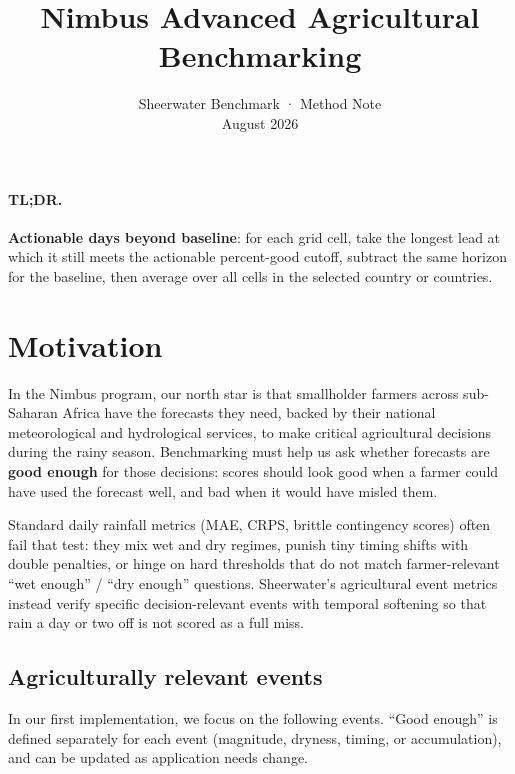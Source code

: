 \documentclass[11pt]{article}
\title{Nimbus Advanced Agricultural Benchmarking}
\author{Sheerwater Benchmark · Method Note\\August 2026}
\date{}
\begin{document}
\maketitle
\thispagestyle{empty}

\paragraph{TL;DR.}
\textbf{Actionable days beyond baseline}:
for each grid cell, take the longest lead at which it still meets the
actionable percent-good cutoff, subtract the same horizon for the baseline,
then average over all cells in the selected country or countries.

\section{Motivation}

In the Nimbus program, our north star is that smallholder farmers across
sub-Saharan Africa have the forecasts they need, backed by their national
meteorological and hydrological services, to make critical agricultural
decisions during the rainy season. Benchmarking must help us ask whether
forecasts are \textbf{good enough} for those decisions: scores should look good
when a farmer could have used the forecast well, and bad when it would have
misled them.

Standard daily rainfall metrics (MAE, CRPS, brittle contingency scores) often
fail that test: they mix wet and dry regimes, punish tiny timing shifts with
double penalties, or hinge on hard thresholds that do not match farmer-relevant
``wet enough'' / ``dry enough'' questions. Sheerwater's agricultural event
metrics instead verify specific decision-relevant events with temporal
softening so that rain a day or two off is not scored as a full miss.

\subsection*{Agriculturally relevant events}

In our first implementation, we focus on the following events. ``Good enough''
is defined separately for each event (magnitude, dryness, timing, or
accumulation), and can be updated as application needs change.
\end{document}
